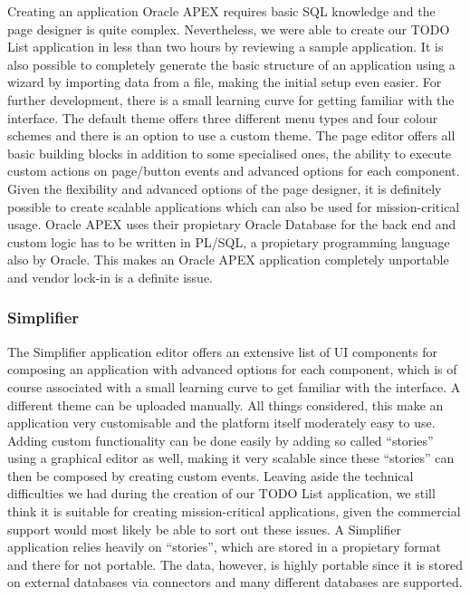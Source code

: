 \documentclass[runningheads]{llncs}
\begin{document}
Creating an application Oracle APEX requires basic SQL knowledge and the page designer is quite complex. Nevertheless, we were able to create our TODO List application in less than two hours by reviewing a sample application. It is also possible to completely generate the basic structure of an application using a wizard by importing data from a file, making the initial setup even easier. For further development, there is a small learning curve for getting familiar with the interface. The default theme offers three different menu types and four colour schemes and there is an option to use a custom theme. The page editor offers all basic building blocks in addition to some specialised ones, the ability to execute custom actions on page/button events and advanced options for each component. Given the flexibility and advanced options of the page designer, it is definitely possible to create scalable applications which can also be used for mission-critical usage. Oracle APEX uses their propietary Oracle Database for the back end and custom logic has to be written in PL/SQL, a propietary programming language also by Oracle. This makes an Oracle APEX application completely unportable and vendor lock-in is a definite issue.

\subsubsection{Simplifier}

The Simplifier application editor offers an extensive list of UI components for composing an application with advanced options for each component, which is of course associated with a small learning curve to get familiar with the interface. A different theme can be uploaded manually. All things considered, this make an application very customisable and the platform itself moderately easy to use. Adding custom functionality can be done easily by adding so called “stories” using a graphical editor as well, making it very scalable since these “stories” can then be composed by creating custom events. Leaving aside the technical difficulties we had during the creation of our TODO List application, we still think it is suitable for creating mission-critical applications, given the commercial support would most likely be able to sort out these issues. A Simplifier application relies heavily on “stories”, which are stored in a propietary format and there for not portable. The data, however, is highly portable since it is stored on external databases via connectors and many different databases are supported.
\end{document}
